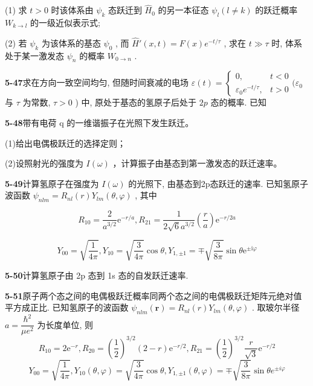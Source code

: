 (1) 求 $\displaystyle t > 0$ 时该体系由 $\displaystyle \psi_k$ 态跃迁到 $\displaystyle \hat{H}_0$ 的另一本征态 $\displaystyle \psi_l(l \neq k)$ 的跃迁概率 $\displaystyle W_{k \to l}$ 的一级近似表示式;

(2) 若 $\displaystyle \psi_k$ 为该体系的基态 $\displaystyle \psi_0$ , 而 $\displaystyle \hat{H}'(x,t) = F(x)e^{-t / \tau}$ , 求在 $\displaystyle t \gg \tau$ 时, 体系处于某一激发态 $\displaystyle \psi_n$ 的概率 $\displaystyle W_{0 \to n}$ .

\vfill

\newpage

\textbf{5-47}\quad 求在方向一致空间均匀, 但随时间衰减的电场 $\displaystyle \varepsilon(t) = \begin{cases} 0, & t < 0 \\ \varepsilon_0 e^{-t/\tau}, & t > 0 \end{cases} (\varepsilon_0$ 与 $\displaystyle \tau$ 为常数, $\displaystyle \tau > 0$ ) 中, 原处于基态的氢原子后处于 $\displaystyle 2p$ 态的概率. 已知

\vfill

\newpage

\textbf{5-48}\quad 带有电荷 q 的一维谐振子在光照下发生跃迁。

(1)给出电偶极跃迁的选择定则；

(2)设照射光的强度为 $\displaystyle I(\omega)$ ，计算振子由基态到第一激发态的跃迁速率。

\vfill

\newpage

\textbf{5-49}\quad 计算氢原子在强度为 $\displaystyle I(\omega)$ 的光照下, 由基态到2p态跃迁的速率. 已知氢原子波函数 $\displaystyle \psi_{nlm} = R_{nl}(r)Y_{lm}(\theta, \varphi)$ , 其中

$$
R _ {1 0} = \dfrac {2}{a ^ {3 / 2}} \mathrm{e} ^ {- r / a}, R _ {2 1} = \dfrac {1}{2 \sqrt {6} a ^ {3 / 2}} \left(\dfrac {r}{a}\right) \mathrm{e} ^ {- r / 2 a}
$$

$$
Y _ {0 0} = \sqrt {\dfrac {1}{4 \pi}}, Y _ {1 0} = \sqrt {\dfrac {3}{4 \pi}} \cos \theta , Y _ {1, \pm 1} = \mp \sqrt {\dfrac {3}{8 \pi}} \sin \theta \mathrm{e} ^ {\pm \mathrm{i} \varphi}
$$

\vfill

\newpage

\textbf{5-50}\quad 计算氢原子由 2p 态到 1s 态的自发跃迁速率.

\vfill

\newpage

\textbf{5-51}\quad 原子两个态之间的电偶极跃迁概率同两个态之间的电偶极跃迁矩阵元绝对值平方成正比. 已知氢原子的波函数 $\displaystyle \psi_{nlm}(\boldsymbol{r}) = R_{nl}(r)Y_{lm}(\theta, \varphi)$ . 取玻尔半径 $\displaystyle a = \dfrac{\hbar^2}{\mu e^2}$ 为长度单位, 则
$$
R _ {1 0} = 2 \mathrm{e} ^ {- r}, R _ {2 0} = \left(\dfrac {1}{2}\right) ^ {3 / 2} (2 - r) \mathrm{e} ^ {- r / 2}, R _ {2 1} = \left(\dfrac {1}{2}\right) ^ {3 / 2} \dfrac {r}{\sqrt {3}} \mathrm{e} ^ {- r / 2}
$$
$$
Y _ {0 0} = \sqrt {\dfrac {1}{4 \pi}}, Y _ {1 0} (\theta , \varphi) = \sqrt {\dfrac {3}{4 \pi}} \cos \theta , Y _ {1, \pm 1} (\theta , \varphi) = \mp \sqrt {\dfrac {3}{8 \pi}} \sin \theta e ^ {\pm i \varphi}
$$

